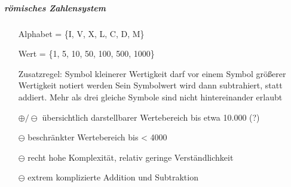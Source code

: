 \documentclass[10pt,a4paper]{scrartcl}
\begin{document}
	\subparagraph{römisches Zahlensystem}
	\begin{itemize}
		\item[] Alphabet = \{I, V, X, L, C, D, M\}
		\item[] Wert = \{1, 5, 10, 50, 100, 500, 1000\}
		\item[] Zusatzregel: Symbol kleinerer Wertigkeit darf vor einem Symbol größerer Wertigkeit notiert werden Sein Symbolwert wird dann subtrahiert, statt addiert. Mehr als drei gleiche Symbole sind nicht hintereinander erlaubt 
		\item[$ \oplus/\ominus $] übersichtlich darstellbarer Wertebereich bis etwa 10.000 (?)
		\item[$ \ominus $] beschränkter Wertebereich bis < 4000
		\item[$ \ominus $] recht hohe Komplexität, relativ geringe Verständlichkeit
		\item[$ \ominus $] extrem komplizierte Addition und Subtraktion
	\end{itemize}
\end{document}
